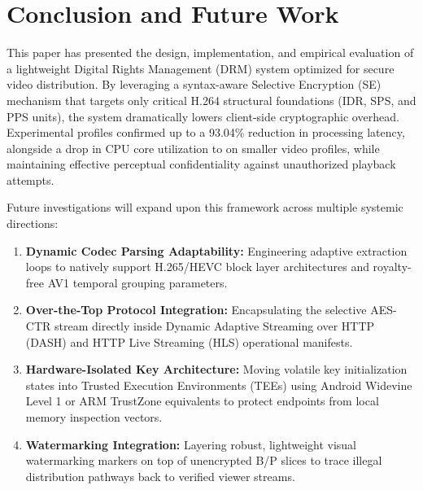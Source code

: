\section{Conclusion and Future Work}
This paper has presented the design, implementation, and empirical evaluation of a lightweight Digital Rights Management (DRM) system optimized for secure video distribution. By leveraging a syntax-aware Selective Encryption (SE) mechanism that targets only critical H.264 structural foundations (IDR, SPS, and PPS units), the system dramatically lowers client-side cryptographic overhead. Experimental profiles confirmed up to a 93.04\% reduction in processing latency, alongside a drop in CPU core utilization to on smaller video profiles, while maintaining effective perceptual confidentiality against unauthorized playback attempts.

Future investigations will expand upon this framework across multiple systemic directions:
\begin{enumerate}
    \item \textbf{Dynamic Codec Parsing Adaptability:} Engineering adaptive extraction loops to natively support H.265/HEVC block layer architectures and royalty-free AV1 temporal grouping parameters.
    \item \textbf{Over-the-Top Protocol Integration:} Encapsulating the selective AES-CTR stream directly inside Dynamic Adaptive Streaming over HTTP (DASH) and HTTP Live Streaming (HLS) operational manifests.
    \item \textbf{Hardware-Isolated Key Architecture:} Moving volatile key initialization states into Trusted Execution Environments (TEEs) using Android Widevine Level 1 or ARM TrustZone equivalents to protect endpoints from local memory inspection vectors.
    \item \textbf{Watermarking Integration:} Layering robust, lightweight visual watermarking markers on top of unencrypted B/P slices to trace illegal distribution pathways back to verified viewer streams.
\end{enumerate}